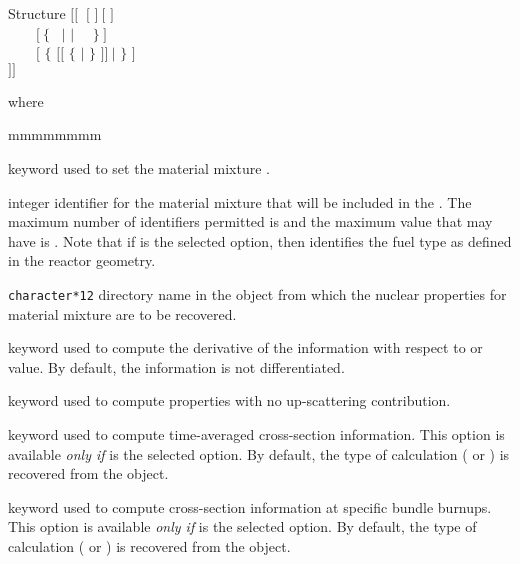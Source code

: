 \begin{DataStructure}{Structure }
$[[$    $~[$  $]~[$  $]$ \\
~~~~$[~\{$~ $|$  $|$ ~~$\}~]$ \\
~~~~$[$  $\{$ $[[$  $\{$  $|$ \moc{*} $\}$ $]]~|$  $\}$ $]$ \\
 $]]$
\end{DataStructure}

\noindent where
\begin{ListeDeDescription}{mmmmmmmm}

\item[\moc{MIX}] keyword used to set the material mixture .

\item[\dusa{mix}] integer identifier for the material mixture that will be
included in the . The maximum number of identifiers
permitted is  and the maximum value that  may
have is . Note that if  is the selected option,
then  identifies the fuel type as defined in the reactor geometry.

\item[\dusa{NAMDIR}] \texttt{character*12} directory name in the
 object from which the nuclear properties for material
mixture  are to be recovered.

\item[\moc{DERIV}] keyword used to compute the derivative of the
 information with respect to  or 
value. By default, the  information is not differentiated.

\item[\moc{UPS}] keyword used to compute properties with no
up-scattering contribution.

\item[\moc{TIMAV-BURN}] keyword used to compute time-averaged cross-section information.
This option is available {\sl only if}  is the selected option.
By default, the type of calculation ( or )
is recovered from the  object.

\item[\moc{INST-BURN}] keyword used to compute cross-section information
at specific bundle burnups. This option is available {\sl only if}  is the selected option.
By default, the type of calculation ( or )
is recovered from the  object.


\end{ListeDeDescription}
